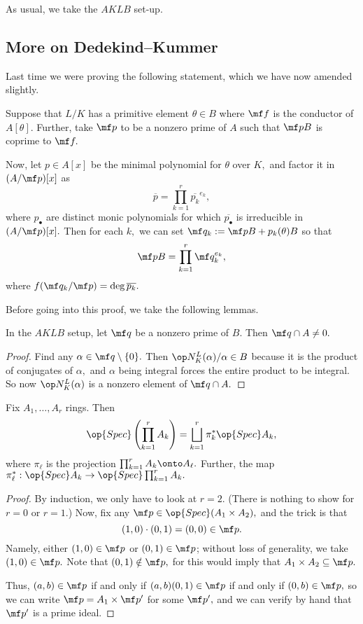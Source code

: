 \documentclass[../notes.tex]{subfiles}
\begin{document}















As usual, we take the $AKLB$ set-up.

\subsection{More on Dedekind--Kummer}
Last time we were proving the following statement, which we have now amended slightly.
\begin{theorem} \label{thm:dk}
	Suppose that $L/K$ has a primitive element $\theta\in B$ where $\mf f$ is the conductor of $A[\theta].$ Further, take $\mf p$ to be a nonzero prime of $A$ such that $\mf pB$ is coprime to $\mf f.$

	Now, let $p\in A[x]$ be the minimal polynomial for $\theta$ over $K,$ and factor it in $(A/\mf p)[x]$ as
	\[\overline p=\prod_{k=1}^r\overline{p_k}^{e_k},\]
	where $p_\bullet$ are distinct monic polynomials for which $\overline{p_\bullet}$ is irreducible in $(A/\mf p)[x].$ Then for each $k,$ we can set $\mf q_k:=\mf pB+p_k(\theta)B$ so that
	\[\mf pB=\prod_{k=1}^r\mf q_k^{e_k},\]
	where $f(\mf q_k/\mf p)=\deg\overline{p_k}.$
\end{theorem}
Before going into this proof, we take the following lemmas.
\begin{lemma}
	In the $AKLB$ setup, let $\mf q$ be a nonzero prime of $B.$ Then $\mf q\cap A\ne0.$
\end{lemma}
\begin{proof}
	Find any $\alpha\in\mf q\setminus\{0\}.$ Then $\op N_K^L(\alpha)/\alpha\in B$ because it is the product of conjugates of $\alpha,$ and $\alpha$ being integral forces the entire product to be integral. So now $\op N_K^L(\alpha)$ is a nonzero element of $\mf q\cap A.$
\end{proof}
\begin{lemma} \label{lem:specprod}
	Fix $A_1,\ldots,A_r$ rings. Then
	\[\op{Spec}\left(\prod_{k=1}^rA_k\right)=\bigsqcup_{k=1}^r\pi_k^*\op{Spec}A_k,\]
	where $\pi_\ell$ is the projection $\prod_{k=1}^rA_k\onto A_\ell.$ Further, the map $\pi_\ell^*:\op{Spec}A_k\to\op{Spec}\prod_{k=1}^rA_k.$
\end{lemma}
\begin{proof}
	By induction, we only have to look at $r=2.$ (There is nothing to show for $r=0$ or $r=1.$) Now, fix any $\mf p\in\op{Spec}(A_1\times A_2),$ and the trick is that
	\[(1,0)\cdot(0,1)=(0,0)\in\mf p.\]
	Namely, either $(1,0)\in\mf p$ or $(0,1)\in\mf p$; without loss of generality, we take $(1,0)\in\mf p.$ Note that $(0,1)\notin\mf p,$ for this would imply that $A_1\times A_2\subseteq\mf p.$
	
	Thus, $(a,b)\in\mf p$ if and only if $(a,b)(0,1)\in\mf p$ if and only if $(0,b)\in\mf p,$ so we can write $\mf p=A_1\times\mf p'$ for some $\mf p',$ and we can verify by hand that $\mf p'$ is a prime ideal.
\end{proof}
\end{document}
